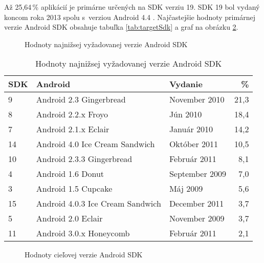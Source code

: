 Až 25,64\,\% aplikácií je primárne určených na SDK verziu 19. SDK 19 bol vydaný koncom roka 2013 spolu s~verziou Android 4.4 . Najčastejšie hodnoty primárnej verzie Android SDK obsahuje tabuľka \ref{tab:targetSdk} a graf na obrázku \ref{targetSdkGraf}.

\begin{figure}[H]
\centering
\begin{bchart}[min=0,max=25,step=5,unit=\%]
\bcskip{3pt}
\bcskip{3pt}
\bcskip{3pt}
\bcskip{3pt}
\bcskip{3pt}
\bcskip{3pt}
\bcskip{3pt}
\bcskip{3pt}
\bcskip{3pt}
\end{bchart}

\caption{Hodnoty najnižsej vyžadovanej verzie Android SDK}
\label{minSdkGraf}
\end{figure}

\begin{table}[H]
\centering
  \begin{tabular}{|l l l r|}
    \hline
    \textbf{SDK} & \textbf{Android} & \textbf{Vydanie}& \textbf{\%} \\\hline\hline
    9 & Android 2.3 Gingerbread & November 2010 & 21,3 \\
    8 & Android 2.2.x Froyo & Jún 2010& 18,4 \\
    7 & Android 2.1.x Eclair & Január 2010 & 14,2 \\
    14 & Android 4.0 Ice Cream Sandwich & Október 2011 & 10,5 \\
    10 & Android 2.3.3 Gingerbread & Február 2011 & 8,1 \\
    4 & Android 1.6	Donut & September 2009 & 7,0 \\
    3 & Android 1.5	Cupcake & Máj 2009 & 5,6 \\
    15 & Android 4.0.3 Ice Cream Sandwich & December 2011 & 3,7 \\
    5 & Android 2.0 Eclair & November 2009 & 3,7 \\
    11 & Android 3.0.x Honeycomb & Február 2011 & 2,1\\
    \hline
  \end{tabular}
  \caption{Hodnoty najnižsej vyžadovanej verzie Android SDK}
  \label{tab:minSdk}
\end{table}

\begin{figure}[H]
\centering
\begin{bchart}[min=0,max=30,step=5,unit=\%]
\bcskip{3pt}
\bcskip{3pt}
\bcskip{3pt}
\bcskip{3pt}
\bcskip{3pt}
\bcskip{3pt}
\bcskip{3pt}
\bcskip{3pt}
\bcskip{3pt}
\end{bchart}

\caption{Hodnoty cieľovej verzie Android SDK}
\label{targetSdkGraf}
\end{figure}

